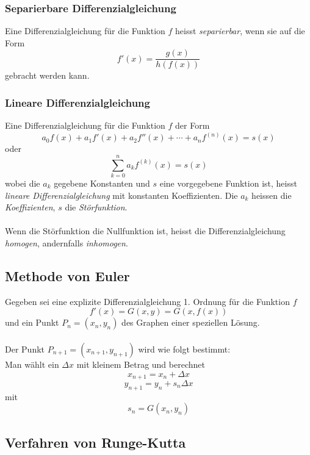 \documentclass[10pt,a4paper]{scrartcl}
\begin{document}
\subsubsection{Separierbare Differenzialgleichung}

Eine Differenzialgleichung für die Funktion $f$ heisst
\textit{separierbar}, wenn sie auf die Form
$$f'(x) = \frac{g(x)}{h(f(x))}$$
gebracht werden kann.


\subsubsection{Lineare Differenzialgleichung}

Eine Differenzialgleichung für die Funktion $f$ der Form
$$a_0 f(x) + a_1 f'(x) + a_2 f''(x) + \dotsb + a_n f^{(n)}(x) = s(x)$$
oder
$$\sum\limits_{k=0}^n a_k f^{(k)}(x) = s(x)$$
wobei die $a_k$ gegebene Konstanten und $s$ eine vorgegebene
Funktion ist, heisst \textit{lineare Differenzialgleichung}
mit konstanten Koeffizienten. Die $a_k$ heissen die
\textit{Koeffizienten}, $s$ die \textit{Störfunktion}.\\\\
Wenn die Störfunktion die Nullfunktion ist, heisst die
Differenzialgleichung \textit{homogen}, andernfalls
\textit{inhomogen}.


\subsection{Methode von Euler}

Gegeben sei eine explizite Differenzialgleichung 1. Ordnung für die Funktion $f$
$$f'(x) = G(x, y) = G(x,f(x))$$
und ein Punkt $P_n = (x_n,y_n)$ des Graphen einer speziellen Lösung.\\\\
Der Punkt $P_{n+1} = (x_{n+1}, y_{n+1})$ wird wie folgt bestimmt:\\
Man wählt ein $\Delta{x}$ mit kleinem Betrag und berechnet
$$x_{n+1} = x_n + \Delta x$$
$$y_{n+1} = y_n + s_n\Delta x$$
mit
$$s_n = G(x_n,y_n)$$


\subsection{Verfahren von Runge-Kutta}
\end{document}
